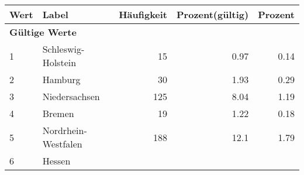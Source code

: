      \begin{longtable}{lXrrr}
     \toprule
     \textbf{Wert} & \textbf{Label} & \textbf{Häufigkeit} & \textbf{Prozent(gültig)} & \textbf{Prozent} \\
     \endhead
     \midrule
     \multicolumn{5}{l}{\textbf{Gültige Werte}}\\

     1 &
     \multicolumn{1}{X}{ Schleswig-Holstein   } &


       \num{15} &
       \num[round-mode=places,round-precision=2]{0.97} &
         \num[round-mode=places,round-precision=2]{0.14} \\

     2 &
     \multicolumn{1}{X}{ Hamburg   } &


       \num{30} &
       \num[round-mode=places,round-precision=2]{1.93} &
         \num[round-mode=places,round-precision=2]{0.29} \\

     3 &
     \multicolumn{1}{X}{ Niedersachsen   } &


       \num{125} &
       \num[round-mode=places,round-precision=2]{8.04} &
         \num[round-mode=places,round-precision=2]{1.19} \\

     4 &
     \multicolumn{1}{X}{ Bremen   } &


       \num{19} &
       \num[round-mode=places,round-precision=2]{1.22} &
         \num[round-mode=places,round-precision=2]{0.18} \\

     5 &
     \multicolumn{1}{X}{ Nordrhein-Westfalen   } &


       \num{188} &
       \num[round-mode=places,round-precision=2]{12.1} &
         \num[round-mode=places,round-precision=2]{1.79} \\

     6 &
     \multicolumn{1}{X}{ Hessen   } &



\end{longtable}
